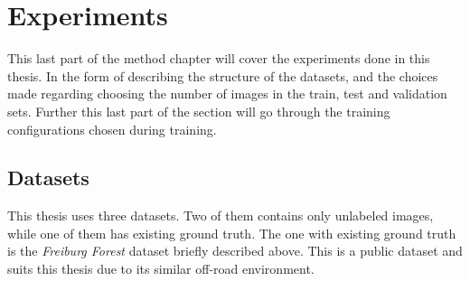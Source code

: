 \documentclass[USenglish]{ifimaster}  %
\begin{document}
\section{Experiments}
This last part of the method chapter will cover the experiments done in this thesis. In the form of describing the structure of the datasets, and the choices made regarding choosing the number of images in the train, test and validation sets. Further this last part of the section will go through the training configurations chosen during training.  
\subsection{Datasets}\label{datasets}
This thesis uses three datasets. Two of them contains only unlabeled images, while one of them has existing ground truth. The one with existing ground truth is the \textit{Freiburg Forest} dataset briefly described above. This is a public dataset and suits this thesis due to its similar off-road environment. 
\end{document}

